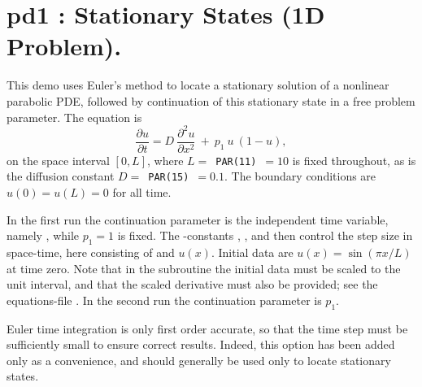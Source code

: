 \documentclass[12pt]{report}
\begin{document}
\newpage
\section{ pd1 : Stationary States (1D Problem).} \label{sec:Demos_pd1}
This demo uses Euler's method to locate a stationary solution of
a nonlinear parabolic PDE, followed by continuation of this stationary
state in a free problem parameter. The equation is
 $$ \frac{\partial u }{ \partial t} 
  = D~\frac{\partial^2 u }{ \partial x^2} ~+~  p_1~ u ~( 1-u) , $$
on the space interval $[0,L]$, where $L=$~{\tt PAR(11)}~$=10$ is fixed throughout,
as is the diffusion constant $D=$~{\tt PAR(15)}~$=0.1$.
The boundary conditions are $u(0) = u(L) = 0$ for all time.

In the first run the continuation parameter is the independent time variable,
namely , while $p_1=1$ is fixed.
The \AUTO-constants , , and  then control the step size
in space-time, here consisting of  and  $u(x)$.
Initial data are $u(x)=\sin(\pi x/L)$ at time zero.
Note that in the subroutine  the initial data must be scaled to 
the unit interval, and that the scaled derivative must also be provided; 
see the equations-file .
In the second run the continuation parameter is $p_1$.

Euler time integration is only first order accurate, so that
the time step must be sufficiently small to ensure correct results.
Indeed, this option has been added only as a convenience, and should 
generally be used only to locate stationary states.
\end{document}
